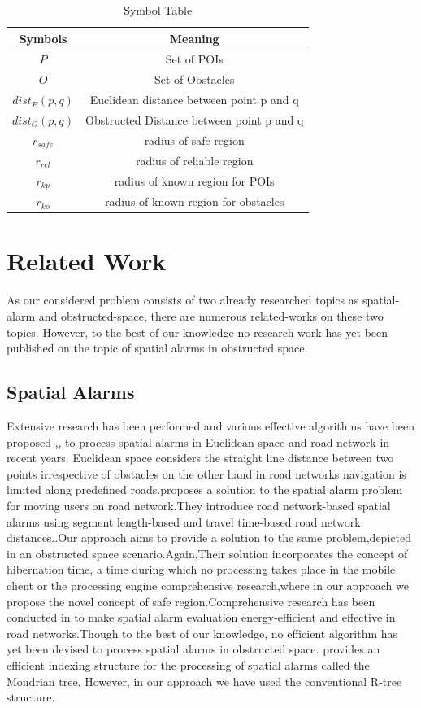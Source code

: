 \documentclass{sig-alternate}
\begin{document}
\begin{table}[h]
\centering

\caption{Symbol Table}
\begin{tabular}{|c|c|} \hline
Symbols&Meaning \\ \hline
$P$ & Set of POIs\\ \hline
$O$ & Set of Obstacles\\ \hline
$dist_E(p,q)$ & Euclidean distance between point p and q\\ \hline
$dist_O(p,q)$ & Obstructed Distance between point p and q\\ \hline
$r_{safe}$    & radius of safe region\\ \hline
$r_{rel}$     & radius of reliable region\\ \hline
$r_{kp}$      &radius of known region for POIs\\ \hline
$r_{ko}$      &radius of known region for obstacles\\ \hline
\end{tabular}
\end{table}

 
\section{Related Work}
As our considered problem consists of two already researched topics as spatial-alarm and obstructed-space, there are numerous related-works on these two topics.  However, to the best of our knowledge no research work has yet been published on the topic of spatial alarms in obstructed space.
\subsection{Spatial Alarms}
Extensive research has been performed and various  effective algorithms have been proposed \cite{roadalarm},\cite{mur},\cite{bamba} to process spatial alarms in Euclidean space and road network in recent years. Euclidean space considers the straight line distance between two points irrespective of obstacles on the other hand in road networks navigation is limited along predefined roads.\cite{roadalarm}proposes a solution to the spatial alarm problem for moving users on road network.They introduce road network-based spatial alarms using segment length-based and travel time-based road network distances..Our approach aims to provide a solution to the same problem,depicted in an obstructed space\cite{deberg} scenario.Again,Their solution incorporates the concept of hibernation time, a time during which no processing takes place in the mobile client or the processing engine comprehensive research,where in our approach we propose the novel concept of safe region.Comprehensive research has been conducted in \cite{liu} to make spatial alarm evaluation energy-efficient and effective in road networks.Though to the best of our knowledge, no efficient algorithm has yet been devised to process spatial alarms in obstructed space. \cite{mondrian} provides an efficient indexing structure for the processing of spatial alarms called the Mondrian tree. However, in our approach we have used the conventional R-tree structure. 
\end{document}
